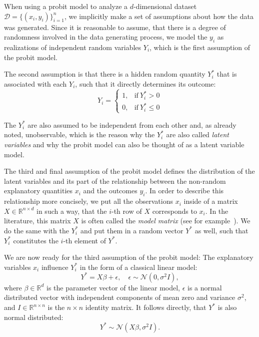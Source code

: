 When using a probit model to analyze a $d$-dimensional dataset
$\mathcal{D} = \{(x_i, y_i)\}_{i=1}^n$, we implicitly
make a set of assumptions about how the data was generated.
Since it is reasonable to assume, that there is a degree of randomness
involved in the data generating process, we model the $y_i$ as realizations
of independent random variables $Y_i$, which is the first
assumption of the probit model.

The second assumption is that there is
a hidden random quantity
$Y_i^\ast$ that is associated with each $Y_i$, such that it
directly determines its outcome:
\begin{equation}
    Y_i =
    \begin{cases}
        1, & \text{if}\ Y_i^\ast > 0    \\
        0, & \text{if}\ Y_i^\ast \leq 0
    \end{cases}
\end{equation}

\noindent The $Y_i^\ast$ are also assumed to be independent from each
other and, as already noted, unobservable,
which is the reason why the $Y_i^\ast$ are also called \textit{latent variables}
and why the probit model can also be thought of as a
latent variable model.

The third and final assumption of the probit model defines the
distribution of the latent variables and its part of the relationship
between the non-random explanatory quantities $x_i$ and the outcomes $y_i$.
In order to describe this relationship more concisely,
we put all the observations $x_i$ inside of a
matrix $X \in \mathbb{R}^{n \times d}$ in such a way, that
the $i$-th row of $X$ corresponds to $x_i$.
In the literature, this matrix $X$ is often called the \textit{model matrix}
(see for example~\cite{glm-agresti}).
We do the same with the $Y_i^\ast$ and put them in a
random vector $Y^\ast$ as well, such that $Y_i^\ast$ constitutes
the $i$-th element of $Y^\ast$.

We are now ready for the third assumption of the probit model:
The explanatory variables
$x_i$ influence $Y_i^\ast$ in the form of a classical linear model:
\begin{equation}
    Y^\ast = X \beta + \epsilon, \quad \epsilon \sim \mathcal{N}(0, \sigma^2 I),
\end{equation}
where $\beta \in \mathbb{R}^d$ is the parameter vector of the linear model,
$\epsilon$ is a normal distributed vector with independent components of
mean zero and variance $\sigma^2$,
and
$I \in \mathbb{R}^{n \times n}$ is the $n \times n$ identity matrix.
It follows directly, that $Y^\ast$ is also normal distributed:
\begin{equation}
    Y^\ast \sim \mathcal{N}(X \beta, \sigma^2 I).
\end{equation}

